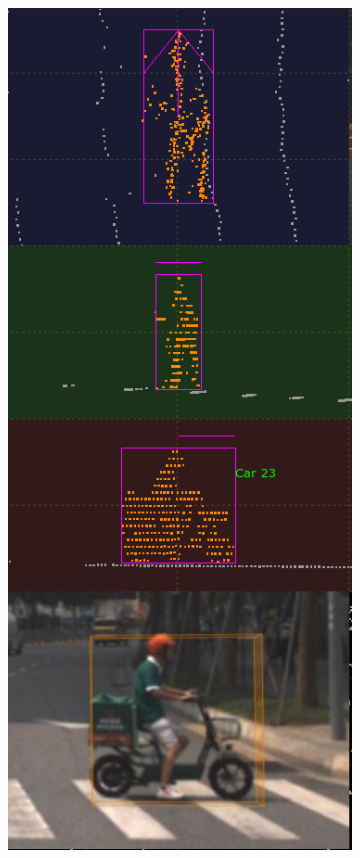 \documentclass[letterpaper, 10 pt, conference]{ieeeconf}  %
\begin{document}
\begin{figure}[th]
\begin{subfigure}{0.16\linewidth}
		\includegraphics[scale=0.12]{./figures/transfer/rider-1}
		\caption{}
	\end{subfigure}
	~
	\begin{subfigure}{0.16\linewidth}

\end{subfigure}
\end{figure}
\end{document}
